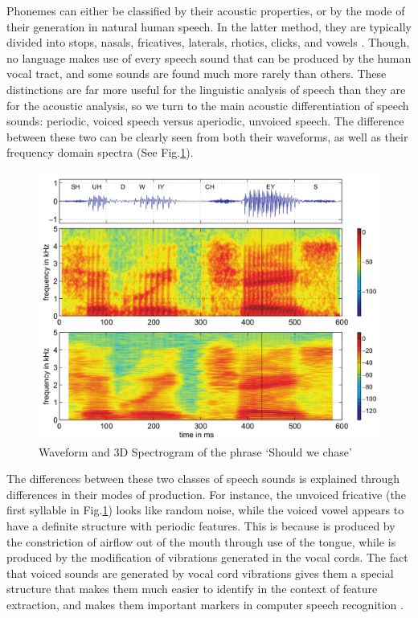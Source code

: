 \documentclass[titlepage]{article}
\begin{document}
    Phonemes can either be classified by their acoustic properties,
    or by the mode of their generation in natural human speech. In the latter
    method, they are typically divided into stops, nasals, fricatives, laterals, rhotics,
    clicks, and vowels \cite{Ladefoged1996}. Though, no language makes use of every speech sound
    that can be produced by the human vocal tract, and some sounds are found much
    more rarely than others. These distinctions are far more useful for the linguistic analysis
    of speech than they are for the acoustic analysis, so we turn to the main acoustic
    differentiation of speech sounds: periodic, voiced speech versus aperiodic, unvoiced speech.
    The difference between these two can be clearly seen from both their waveforms, as well as
    their frequency domain spectra (See Fig.\ref{exampleSpectrogram}).


    \begin{figure}
      \centering
      \includegraphics[scale=0.23]{exampleSpectrogram}
      \caption{Waveform and 3D Spectrogram of the phrase `Should we chase' \cite{Rabiner2007}}
      \label{exampleSpectrogram}
    \end{figure}


    The differences between these two classes of speech sounds is explained
    through differences in their modes of production. For instance, the unvoiced
    fricative \textipa{[S]} (the first syllable in Fig.\ref{exampleSpectrogram})
    looks like random noise, while the voiced vowel \textipa{[U]} appears to have
    a definite structure with periodic features. This is because \textipa{[S]} is
    produced by the constriction of airflow out of the mouth through use of the tongue,
    while \textipa{[U]} is produced by the modification of vibrations generated in the
    vocal cords. The fact that voiced sounds are generated by vocal cord vibrations gives
    them a special structure that makes them much easier to identify in the context of
    feature extraction, and makes them important markers in computer speech recognition
    \cite{Gutierrez-Osuna2017}.
\end{document}

